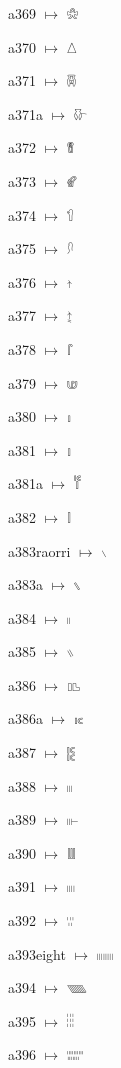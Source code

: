 {\noindent a369 $\mapsto$ {\ahfont 𔖡}\par
\noindent a370 $\mapsto$ {\ahfont 𔖢}\par
\noindent a371 $\mapsto$ {\ahfont 𔖣}\par
\noindent a371a $\mapsto$ {\ahfont 𔖤}\par
\noindent a372 $\mapsto$ {\ahfont 𔖥}\par
\noindent a373 $\mapsto$ {\ahfont 𔖦}\par
\noindent a374 $\mapsto$ {\ahfont 𔖧}\par
\noindent a375 $\mapsto$ {\ahfont 𔖨}\par
\noindent a376 $\mapsto$ {\ahfont 𔖩}\par
\noindent a377 $\mapsto$ {\ahfont 𔖪}\par
\noindent a378 $\mapsto$ {\ahfont 𔖫}\par
\noindent a379 $\mapsto$ {\ahfont 𔖬}\par
\noindent a380 $\mapsto$ {\ahfont 𔖭}\par
\noindent a381 $\mapsto$ {\ahfont 𔖮}\par
\noindent a381a $\mapsto$ {\ahfont 𔖯}\par
\noindent a382 $\mapsto$ {\ahfont 𔖰}\par
\noindent a383raorri $\mapsto$ {\ahfont 𔖱}\par
\noindent a383a $\mapsto$ {\ahfont 𔖲}\par
\noindent a384 $\mapsto$ {\ahfont 𔖳}\par
\noindent a385 $\mapsto$ {\ahfont 𔖴}\par
\noindent a386 $\mapsto$ {\ahfont 𔖵}\par
\noindent a386a $\mapsto$ {\ahfont 𔖶}\par
\noindent a387 $\mapsto$ {\ahfont 𔖷}\par
\noindent a388 $\mapsto$ {\ahfont 𔖸}\par
\noindent a389 $\mapsto$ {\ahfont 𔖹}\par
\noindent a390 $\mapsto$ {\ahfont 𔖺}\par
\noindent a391 $\mapsto$ {\ahfont 𔖻}\par
\noindent a392 $\mapsto$ {\ahfont 𔖼}\par
\noindent a393eight $\mapsto$ {\ahfont 𔖽}\par
\noindent a394 $\mapsto$ {\ahfont 𔖾}\par
\noindent a395 $\mapsto$ {\ahfont 𔖿}\par
\noindent a396 $\mapsto$ {\ahfont 𔗀}\par
}
